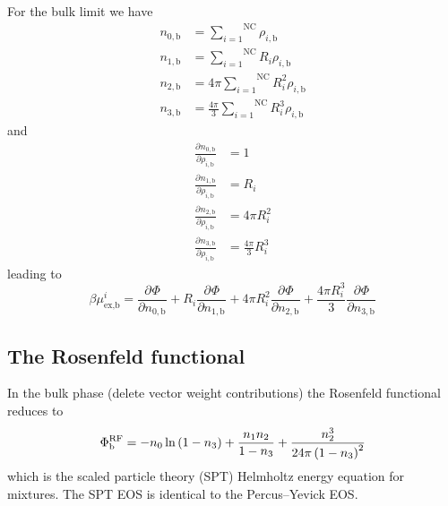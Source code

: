 \documentclass[12pt, letterpaper]{article}
\newcommand*{\pd}[3][]{\frac{\partial^{#1}#2}{\partial{#3}^{#1}}}%
\newcommand*{\lb}{\ensuremath{\left(}}
\newcommand*{\rb}{\ensuremath{\right)}}
\newcommand{\RF}{\ensuremath{\text{RF}}\xspace}
\newcommand{\excess}{\ensuremath{\text{ex}}\xspace}
\newcommand{\kB}{\ensuremath{\text{k}_{\text{B}}}\xspace}
\newcommand{\bulk}{\ensuremath{\text{b}}\xspace}
\newcommand{\NC}{\ensuremath{\text{NC}}\xspace}
\begin{document}

For the bulk limit we have
\begin{align}
  n_{0,\bulk} &= \overset{\NC}{\underset{i=1}{\sum}} \rho_{i,\bulk}\\
  n_{1,\bulk} &= \overset{\NC}{\underset{i=1}{\sum}} R_i \rho_{i,\bulk}\\
  n_{2,\bulk} &= 4 \pi \overset{\NC}{\underset{i=1}{\sum}} R_i^2 \rho_{i,\bulk}\\
  n_{3,\bulk} &= \frac{4 \pi}{3} \overset{\NC}{\underset{i=1}{\sum}} R_i^3 \rho_{i,\bulk}
\end{align}
and
\begin{align}
  \pd{n_{0,\bulk}}{\rho_{i,\bulk}} &= 1\\
  \pd{n_{1,\bulk}}{\rho_{i,\bulk}} &=  R_i\\
  \pd{n_{2,\bulk}}{\rho_{i,\bulk}} &= 4 \pi R_i^2\\
  \pd{n_{3,\bulk}}{\rho_{i,\bulk}} &= \frac{4 \pi}{3} R_i^3
\end{align}
leading to
\begin{equation}
  \beta \mu^i_{\excess,\bulk} = \pd{\Phi}{n_{0,\bulk}} + R_i \pd{\Phi}{n_{1,\bulk}} + 4 \pi R_i^2 \pd{\Phi}{n_{2,\bulk}} + \frac{4 \pi R_i^3}{3} \pd{\Phi}{n_{3,\bulk}}
\end{equation}

\subsection{The Rosenfeld functional}
In the bulk phase (delete vector weight contributions) the Rosenfeld functional reduces to
\begin{equation}
  \Phi^\RF_\bulk = -n_0 \ln \lb 1 - n_3 \rb +
  \frac{n_1 n_2}{1 - n_3} +
  \frac{n_2^3 }{24\pi \lb 1 - n_3 \rb^2}
\end{equation}
which is the scaled particle theory (SPT) Helmholtz energy equation
for mixtures. The SPT EOS is identical to the Percus–Yevick EOS.
\end{document}
